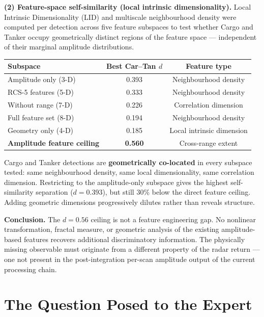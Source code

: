 \documentclass[10.5pt,a4paper]{article}
\begin{document}
\textbf{(2) Feature-space self-similarity (local intrinsic dimensionality).}
Local Intrinsic Dimensionality (LID) and multiscale neighbourhood density
were computed per detection across five feature subspaces to test whether
Cargo and Tanker occupy geometrically distinct regions of the feature space —
independent of their marginal amplitude distributions.

\begin{center}\small
\begin{tabular}{lcc}
\toprule
Subspace & Best Car--Tan $d$ & Feature type \\
\midrule
Amplitude only (3-D) & 0.393 & Neighbourhood density \\
RCS-5 features (5-D) & 0.333 & Neighbourhood density \\
Without range (7-D)  & 0.226 & Correlation dimension \\
Full feature set (8-D) & 0.194 & Neighbourhood density \\
Geometry only (4-D)  & 0.185 & Local intrinsic dimension \\
\midrule
\textbf{Amplitude feature ceiling} & \textbf{0.560} & Cross-range extent \\
\bottomrule
\end{tabular}
\end{center}

Cargo and Tanker detections are \textbf{geometrically co-located} in every
subspace tested: same neighbourhood density, same local dimensionality,
same correlation dimension. Restricting to the amplitude-only subspace
gives the highest self-similarity separation ($d = 0.393$), but still
30\% below the direct feature ceiling. Adding geometric dimensions
progressively dilutes rather than reveals structure.

\textbf{Conclusion.} The $d = 0.56$ ceiling is not a feature engineering
gap. No nonlinear transformation, fractal measure, or geometric analysis
of the existing amplitude-based features recovers additional discriminatory
information. The physically missing observable must originate from a
different property of the radar return — one not present in the
post-integration per-scan amplitude output of the current processing chain.

\section{The Question Posed to the Expert}
\end{document}
